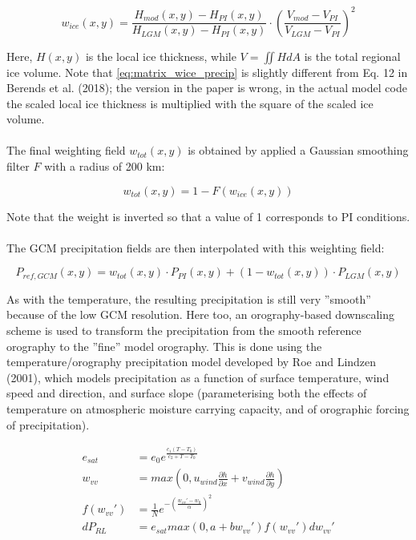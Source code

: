 \documentclass{article}
\begin{document}
\begin{equation} \label{eq:matrix_wice_precip}
w_{ice} (x,y) = \frac{H_{mod}(x,y) - H_{PI}(x,y)}{H_{LGM}(x,y) - H_{PI}(x,y)} \cdot
\left( \frac{V_{mod} - V_{PI}}{V_{LGM} - V_{PI}} \right)^2
\end{equation}

Here, $H(x,y)$ is the local ice thickness, while $V = \iint H dA$ is the total regional ice volume. Note that \eqref{eq:matrix_wice_precip} is slightly different from Eq. 12 in Berends et al. (2018); the version in the paper is wrong, in the actual model code the scaled local ice thickness is multiplied with the square of the scaled ice volume.\\
\\
The final weighting field $w_{tot}(x,y)$ is obtained by applied a Gaussian smoothing filter $F$ with a radius of 200 km:

\begin{equation}
w_{tot} (x,y) = 1 - F( w_{ice} (x,y) )
\end{equation}

Note that the weight is inverted so that a value of 1 corresponds to PI conditions.\\
\\
The GCM precipitation fields are then interpolated with this weighting field:

\begin{equation}
P_{ref,GCM} (x,y) = w_{tot} (x,y) \cdot P_{PI} (x,y) + \left( 1 - w_{tot} (x,y) \right) \cdot P_{LGM} (x,y)
\end{equation}

As with the temperature, the resulting precipitation is still very ''smooth'' because of the low GCM resolution. Here too, an orography-based downscaling scheme is used to transform the precipitation from the smooth reference orography to the ''fine'' model orography. This is done using the temperature/orography precipitation model developed by Roe and Lindzen (2001), which models precipitation as a function of surface temperature, wind speed and direction, and surface slope (parameterising both the effects of temperature on atmospheric moisture carrying capacity, and of orographic forcing of precipitation).

\begin{align}
e_{sat} &= e_0 e^{\frac{c_1 (T - T_0)}{c_2 + T - T_0}} \\
w_{vv} &= max(0, u_{wind} \frac{\partial h}{\partial x} + v_{wind} \frac{\partial h}{\partial y}) \\
f( w_{vv}') &= \frac{1}{N} e^{-{\left( \frac{w_{vv}' - w_0}{\alpha} \right)}^2}\\
dP_{RL} &= e_{sat} max(0, a+b w_{vv}') f( w_{vv}') dw_{vv}'
\end{align}
\end{document}
